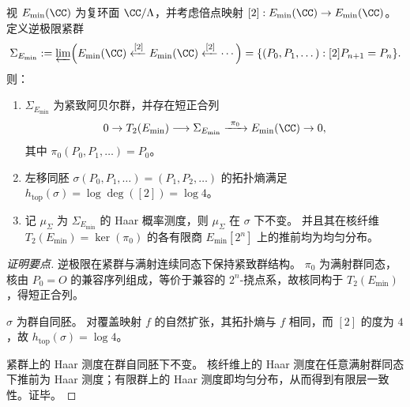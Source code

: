 \begin{theorem}\label{thm:conclusion-leyang-doubling-solenoid-extension}
视 \(E_{\min}(\CC)\) 为复环面 \(\CC/\Lambda\)，并考虑倍点映射 \([2]:E_{\min}(\CC)\to E_{\min}(\CC)\)。
定义逆极限紧群
\[
\Sigma_{E_{\min}}:=\varprojlim\Bigl(E_{\min}(\CC)\xleftarrow{[2]}E_{\min}(\CC)\xleftarrow{[2]}\cdots\Bigr)
=\{(P_0,P_1,\dots):[2]P_{n+1}=P_n\}.
\]
则：
\begin{enumerate}
  \item \(\Sigma_{E_{\min}}\) 为紧致阿贝尔群，并存在短正合列
  \[
  0\to T_2(E_{\min})\longrightarrow \Sigma_{E_{\min}}\xrightarrow{\ \pi_0\ }E_{\min}(\CC)\to 0,
  \]
  其中 \(\pi_0(P_0,P_1,\dots)=P_0\)。
  \item 左移同胚
  \(
  \sigma(P_0,P_1,\dots)=(P_1,P_2,\dots)
  \)
  的拓扑熵满足 \(h_{\mathrm{top}}(\sigma)=\log\deg([2])=\log 4\)。
  \item 记 \(\mu_{\Sigma}\) 为 \(\Sigma_{E_{\min}}\) 的 Haar 概率测度，则 \(\mu_{\Sigma}\) 在 \(\sigma\) 下不变。
  并且其在核纤维 \(T_2(E_{\min})=\ker(\pi_0)\) 的各有限商 \(E_{\min}[2^n]\) 上的推前均为均匀分布。
\end{enumerate}
\end{theorem}
\begin{proof}[证明要点]
逆极限在紧群与满射连续同态下保持紧致群结构。
\(\pi_0\) 为满射群同态，核由 \(P_0=O\) 的兼容序列组成，等价于兼容的 \(2^n\)-挠点系，故核同构于 \(T_2(E_{\min})\)，得短正合列。
\par
\(\sigma\) 为群自同胚。
对覆盖映射 \(f\) 的自然扩张，其拓扑熵与 \(f\) 相同，而 \([2]\) 的度为 \(4\)，故 \(h_{\mathrm{top}}(\sigma)=\log 4\)。
\par
紧群上的 Haar 测度在群自同胚下不变。
核纤维上的 Haar 测度在任意满射群同态下推前为 Haar 测度；有限群上的 Haar 测度即均匀分布，从而得到有限层一致性。证毕。
\end{proof}


